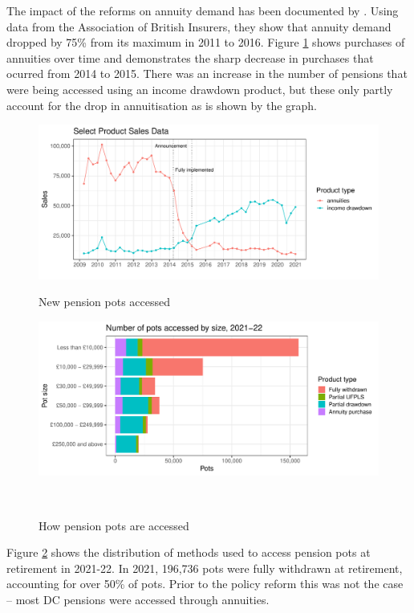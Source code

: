 \documentclass[12pt]{article}
\begin{document}
The impact of the reforms on annuity demand has been documented by
\cite{cannon_et_al_nier_2016}. Using data from the Association of British
Insurers, they show that annuity demand dropped by 75\% from its maximum in
2011 to 2016. Figure \ref{fig:annovertime} shows
purchases of annuities over time and demonstrates the sharp decrease in purchases
that ocurred from 2014 to 2015. There was an increase in the number of pensions
that were being accessed using an income drawdown product, but these only partly
account for the drop in annuitisation as is shown by the graph.
\begin{figure}[h]

    \centering
    \includegraphics[width=0.9\columnwidth]{figures/annuity_overtime.pdf}
    \label{fig:annovertime}
    \caption{New pension pots accessed}
\end{figure}

\begin{figure}[h]

    \centering
    \includegraphics[width=0.9\columnwidth]{figures/annuity_pot_sizes.pdf}
    \caption[Caption for LOF]{How pension pots are accessed\protect\footnotemark}
    \label{fig:ann2122}

    \
\end{figure}
Figure \ref{fig:ann2122} shows the distribution of methods used to access pension pots
at retirement in 2021-22. In 2021, 196,736 pots were fully withdrawn at
retirement, accounting for over 50\% of pots. Prior to the policy reform this
was not the case -- most DC pensions were accessed through
annuities.
\end{document}
